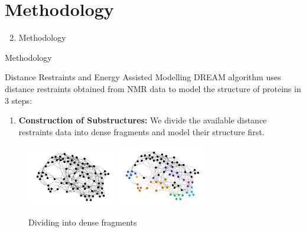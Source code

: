 \section*{Methodology}

\begin{frame}
    \begin{enumerate}
        \setcounter{enumi}{1}
        \item Methodology
    \end{enumerate}
\end{frame}

\begin{frame}{Methodology}
    \begin{block}{Distance Restraints and Energy Assisted Modelling}
        DREAM algorithm uses distance restraints obtained from NMR data to model the structure of proteins in 3 steps:
        \begin{enumerate}
            \item \textbf{Construction of Substructures:} We divide the available distance restraints data into dense fragments and model their structure first.
        \end{enumerate}
        \pause
        \begin{figure}[h]
            \centering
            \includegraphics[width=0.35\textwidth]{images/single.png}
            \pause
            \includegraphics[width=0.35\textwidth]{images/separate.png}
            \caption{Dividing into dense fragments}
            \label{fig:my_label}
        \end{figure}
    \end{block}
\end{frame}

